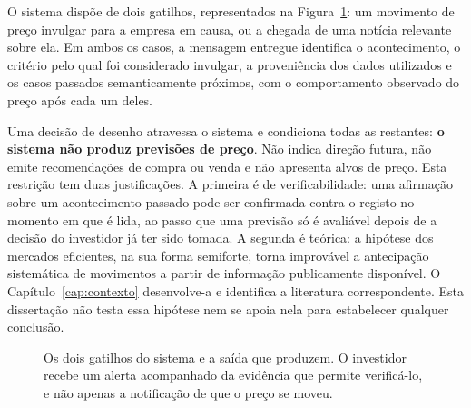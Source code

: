 O sistema dispõe de dois gatilhos, representados na Figura~\ref{fig:conceito}: um movimento de
preço invulgar para a empresa em causa, ou a chegada de uma notícia relevante sobre ela. Em ambos
os casos, a mensagem entregue identifica o acontecimento, o critério pelo qual foi considerado
invulgar, a proveniência dos dados utilizados e os casos passados semanticamente próximos, com o
comportamento observado do preço após cada um deles.

Uma decisão de desenho atravessa o sistema e condiciona todas as restantes: \textbf{o sistema não
produz previsões de preço}. Não indica direção futura, não emite recomendações de compra ou venda
e não apresenta alvos de preço. Esta restrição tem duas justificações. A primeira é de
verificabilidade: uma afirmação sobre um acontecimento passado pode ser confirmada contra o
registo no momento em que é lida, ao passo que uma previsão só é avaliável depois de a decisão do
investidor já ter sido tomada. A segunda é teórica: a hipótese dos mercados eficientes, na
sua forma semiforte, torna improvável a antecipação sistemática de movimentos a partir de
informação publicamente disponível. O Capítulo~\ref{cap:contexto} desenvolve-a e identifica a
literatura correspondente. Esta dissertação não testa essa hipótese nem se apoia nela para
estabelecer qualquer conclusão.

\begin{figure}[htbp]
\centering
{}
\caption[Os dois gatilhos do sistema]{Os dois gatilhos do sistema e a saída que produzem. O
investidor recebe um alerta acompanhado da evidência que permite verificá-lo, e não apenas a
notificação de que o preço se moveu.}
\label{fig:conceito}
\end{figure}

